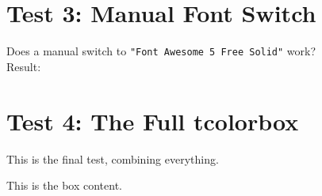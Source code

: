\documentclass{article}
\begin{document}
\section*{Test 3: Manual Font Switch}
Does a manual switch to \verb|"Font Awesome 5 Free Solid"| work? \\
Result: {\sffamily }

\hrulefill

\section*{Test 4: The Full tcolorbox}
This is the final test, combining everything.

\begin{tcolorbox}[
    fonttitle=\sffamily\bfseries,
    title={This is the title}
  ]
  This is the box content.
\end{tcolorbox}
\end{document}
